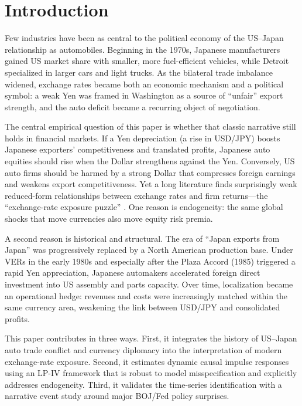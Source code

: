 \documentclass[12pt,a4paper]{article}
\begin{document}
\section{Introduction}

Few industries have been as central to the political economy of the US--Japan relationship as automobiles. Beginning in the 1970s, Japanese manufacturers gained US market share with smaller, more fuel-efficient vehicles, while Detroit specialized in larger cars and light trucks. As the bilateral trade imbalance widened, exchange rates became both an economic mechanism and a political symbol: a weak Yen was framed in Washington as a source of ``unfair'' export strength, and the auto deficit became a recurring object of negotiation.

The central empirical question of this paper is whether that classic narrative still holds in financial markets. If a Yen depreciation (a rise in USD/JPY) boosts Japanese exporters' competitiveness and translated profits, Japanese auto equities should rise when the Dollar strengthens against the Yen. Conversely, US auto firms should be harmed by a strong Dollar that compresses foreign earnings and weakens export competitiveness. Yet a long literature finds surprisingly weak reduced-form relationships between exchange rates and firm returns---the ``exchange-rate exposure puzzle'' \citep{bartram2010}. One reason is endogeneity: the same global shocks that move currencies also move equity risk premia.

A second reason is historical and structural. The era of ``Japan exports from Japan'' was progressively replaced by a North American production base. Under VERs in the early 1980s and especially after the Plaza Accord (1985) triggered a rapid Yen appreciation, Japanese automakers accelerated foreign direct investment into US assembly and parts capacity. Over time, localization became an operational hedge: revenues and costs were increasingly matched within the same currency area, weakening the link between USD/JPY and consolidated profits.

This paper contributes in three ways. First, it integrates the history of US--Japan auto trade conflict and currency diplomacy into the interpretation of modern exchange-rate exposure. Second, it estimates dynamic causal impulse responses using an LP-IV framework \citep{jorda2005} that is robust to model misspecification and explicitly addresses endogeneity. Third, it validates the time-series identification with a narrative event study \citep{mackinlay1997} around major BOJ/Fed policy surprises.
\end{document}

